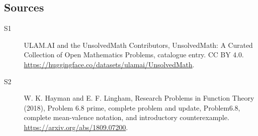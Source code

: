 \documentclass[11pt]{article}
\begin{document}
\subsection{Sources}
\begin{description}
\item[\hypertarget{source:statement:1}{S1}] ULAM.AI and the UnsolvedMath Contributors, UnsolvedMath: A Curated Collection of Open Mathematics Problems, catalogue entry. CC BY 4.0. \url{https://huggingface.co/datasets/ulamai/UnsolvedMath}.
\item[\hypertarget{source:statement:2}{S2}] W. K. Hayman and E. F. Lingham, Research Problems in Function Theory (2018), Problem 6.8 prime, complete problem and update, Problem6.8, complete mean-valence notation, and introductory counterexample. \url{https://arxiv.org/abs/1809.07200}.
\end{description}
\label{end:statement}
\end{document}
